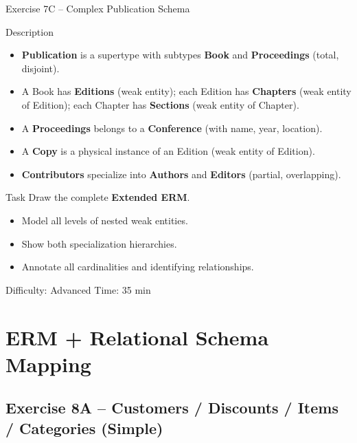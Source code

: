 \documentclass[10pt]{beamer}
\begin{document}
\begin{frame}{Exercise 7C -- Complex Publication Schema}
  \begin{block}{Description}
    \begin{itemize}
      \item \textbf{Publication} is a supertype with subtypes \textbf{Book} and \textbf{Proceedings} (total, disjoint).
      \item A Book has \textbf{Editions} (weak entity); each Edition has \textbf{Chapters} (weak entity of Edition); each Chapter has \textbf{Sections} (weak entity of Chapter).
      \item A \textbf{Proceedings} belongs to a \textbf{Conference} (with name, year, location).
      \item A \textbf{Copy} is a physical instance of an Edition (weak entity of Edition).
      \item \textbf{Contributors} specialize into \textbf{Authors} and \textbf{Editors} (partial, overlapping).
    \end{itemize}
  \end{block}

  \begin{block}{Task}
    Draw the complete \textbf{Extended ERM}.
    \begin{itemize}
      \item Model all levels of nested weak entities.
      \item Show both specialization hierarchies.
      \item Annotate all cardinalities and identifying relationships.
    \end{itemize}
  \end{block}

  \begin{alertblock}{Difficulty: Advanced \quad Time: 35 min}
  \end{alertblock}
\end{frame}

\section{ERM + Relational Schema Mapping}

\subsection{Exercise 8A -- Customers / Discounts / Items / Categories (Simple)}
\end{document}
